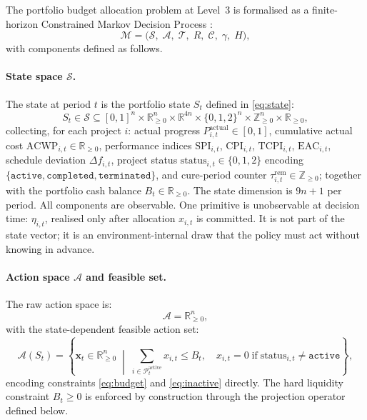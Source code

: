 \begin{definition}
\label{def:cmdp}
The portfolio budget allocation problem at Level~3 is formalised as a
finite-horizon Constrained Markov Decision Process
\citep{altman1999constrained}:
\begin{equation}
  \mathcal{M} = \bigl(
    \mathcal{S},\;\mathcal{A},\;\mathcal{T},\;R,\;\mathcal{C},\;\gamma,\;H
  \bigr),
  \label{eq:cmdp_tuple}
\end{equation}
with components defined as follows.
\end{definition}

\paragraph{State space $\mathcal{S}$.}
The state at period $t$ is the portfolio state $S_t$ defined in
\eqref{eq:state}:
\begin{equation}
  S_t \in \mathcal{S} \subseteq
  [0,1]^n \times \mathbb{R}^n_{\geq 0} \times
  \mathbb{R}^{4n} \times \{0,1,2\}^n \times
  \mathbb{Z}^n_{\geq 0} \times \mathbb{R}_{\geq 0},
  \label{eq:l3_state}
\end{equation}
collecting, for each project $i$: actual progress
$P_{i,t}^{\mathrm{actual}} \in [0,1]$, cumulative actual cost
$\mathrm{ACWP}_{i,t} \in \mathbb{R}_{\geq 0}$, performance indices
$\mathrm{SPI}_{i,t}$, $\mathrm{CPI}_{i,t}$, $\mathrm{TCPI}_{i,t}$,
$\mathrm{EAC}_{i,t}$, schedule deviation $\Delta f_{i,t}$, project status
$\mathrm{status}_{i,t} \in \{0,1,2\}$ encoding
$\{\texttt{active}, \texttt{completed}, \texttt{terminated}\}$, and
cure-period counter $\tau_{i,t}^{\mathrm{rem}} \in \mathbb{Z}_{\geq 0}$;
together with the portfolio cash balance $B_t \in \mathbb{R}_{\geq 0}$.
The state dimension is $9n + 1$ per period. All components are observable.
One primitive is unobservable at decision time: $\eta_{i,t}$, realised
only after allocation $x_{i,t}$ is committed. It is not part of the
state vector; it is an environment-internal draw that the policy must
act without knowing in advance.

\paragraph{Action space $\mathcal{A}$ and feasible set.}
The raw action space is:
\begin{equation}
  \mathcal{A} = \mathbb{R}^n_{\geq 0},
  \label{eq:l3_action}
\end{equation}
with the state-dependent feasible action set:
\begin{equation}
  \mathcal{A}(S_t) = \left\{
    \mathbf{x}_t \in \mathbb{R}^n_{\geq 0} \;\middle|\;
    \sum_{i \in \mathcal{P}_t^{\mathrm{active}}} x_{i,t} \leq B_t,\quad
    x_{i,t} = 0 \;\text{if}\; \mathrm{status}_{i,t} \neq \texttt{active}
  \right\},
  \label{eq:l3_feasible}
\end{equation}
encoding constraints \eqref{eq:budget} and \eqref{eq:inactive}
directly. The hard liquidity constraint $B_t \geq 0$ is enforced by
construction through the projection operator defined below.

